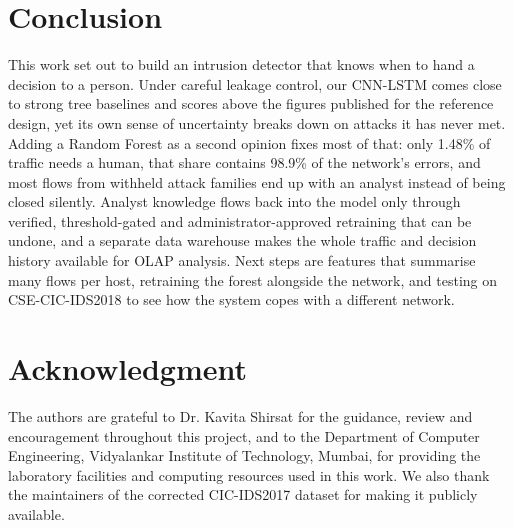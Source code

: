 \documentclass[conference]{IEEEtran}
\begin{document}
\section{Conclusion}
This work set out to build an intrusion detector that knows when to hand a decision to a person.
Under careful leakage control, our CNN-LSTM comes close to strong tree baselines and scores above
the figures published for the reference design, yet its own sense of uncertainty breaks down on
attacks it has never met. Adding a Random Forest as a second opinion fixes most of that: only
1.48\% of traffic needs a human, that share contains 98.9\% of the network's errors, and most
flows from withheld attack families end up with an analyst instead of being closed silently.
Analyst knowledge flows back into the model only through verified, threshold-gated and
administrator-approved retraining that can be undone, and a separate data warehouse makes the
whole traffic and decision history available for OLAP analysis. Next steps are features that summarise many
flows per host, retraining the forest alongside the network, and testing on CSE-CIC-IDS2018 to see
how the system copes with a different network.

\section*{Acknowledgment}
The authors are grateful to Dr. Kavita Shirsat for the guidance, review and encouragement
throughout this project, and to the Department of Computer Engineering, Vidyalankar Institute of
Technology, Mumbai, for providing the laboratory facilities and computing resources used in this
work. We also thank the maintainers of the corrected CIC-IDS2017 dataset for making it publicly
available.
\end{document}
